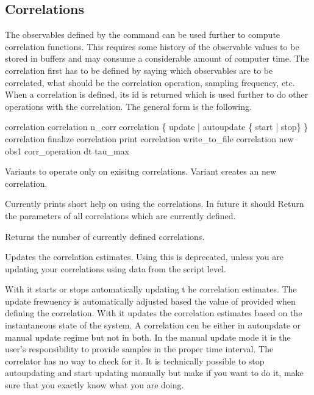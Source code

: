 \subsection{Correlations}

The observables defined by the  command can be used further 
to compute correlation functions. This requires some history of the observable values
to be stored in buffers and may consume a considerable amount of computer time.
The correlation first has to be defined by saying which observables 
are to be correlated, what should be the correlation operation, sampling
frequency, etc. When a correlation is defined, its id is returned which is
used further to do other operations with the correlation.
The general form is the following.
\begin{essyntax}
   correlation 
   correlation n_corr
   correlation  \{ update | autoupdate \{ start | stop\}  \}
   correlation  finalize
   correlation  print 
   correlation  write_to_file 
   correlation new obs1   corr_operation  dt  tau_max   
\end{essyntax}

Variants to  operate only on exisitng correlations.
Variant creates an new correlation.
  
Currently prints short help on using the correlations. In future it should
Return the parameters of all correlations which are currently defined.

Returns the number of currently defined correlations.

Updates the correlation estimates. Using this is deprecated, unless you are
updating your correlations using data from the script level.

With  it starts or stops automatically updating t
he correlation estimates. The update frewuency is automatically adjusted based 
the value of  provided when defining the correlation.
With  it updates the correlation estimates based on the instantaneous
state of the system.
A correlation cen be either in autoupdate or manual update regime but not in both.
In the manual update mode it is the user's responsibility to provide samples
in the proper time interval. The correlator has no way to check for it.
It is technically possible to stop autoupdating and start updating manually but
make if you want to do it, make sure that you exactly know what you are doing.


